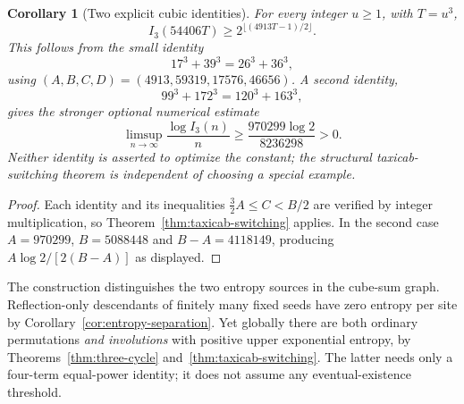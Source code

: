 \documentclass[10pt]{article}
\newtheorem{corollary}{Corollary}
\begin{document}
\begin{corollary}[Two explicit cubic identities]
\label{cor:taxicab-cubes}
For every integer $u\ge1$, with $T=u^3$,
\[
\boxed{\displaystyle
I_3(54406T)\ge
2^{\lfloor(4913T-1)/2\rfloor}.}
\]
This follows from the small identity
\[
17^3+39^3=26^3+36^3,
\]
using $(A,B,C,D)=(4913,59319,17576,46656)$.
A second identity,
\[
99^3+172^3=120^3+163^3,
\]
gives the stronger optional numerical estimate
\[
\boxed{\displaystyle
\limsup_{n\to\infty}\frac{\log I_3(n)}n
\ge\frac{970299\log2}{8236298}>0.}
\]
Neither identity is asserted to optimize
the constant; the structural
taxicab-switching theorem is independent
of choosing a special example.
\end{corollary}
\begin{proof}
Each identity and its inequalities
$\frac32A\le C<B/2$
are verified by integer multiplication,
so Theorem~\ref{thm:taxicab-switching}
applies. In the second case
$A=970299$, $B=5088448$ and
$B-A=4118149$, producing
$A\log2/[2(B-A)]$ as displayed.
\end{proof}

The construction distinguishes the
two entropy sources in the cube-sum graph.
Reflection-only descendants of finitely
many fixed seeds have zero entropy
per site by
Corollary~\ref{cor:entropy-separation}.
Yet globally there are both ordinary
permutations \emph{and involutions}
with positive upper exponential entropy,
by Theorems~\ref{thm:three-cycle}
and~\ref{thm:taxicab-switching}.
The latter needs only a four-term
equal-power identity; it does not
assume any eventual-existence threshold.
\end{document}
